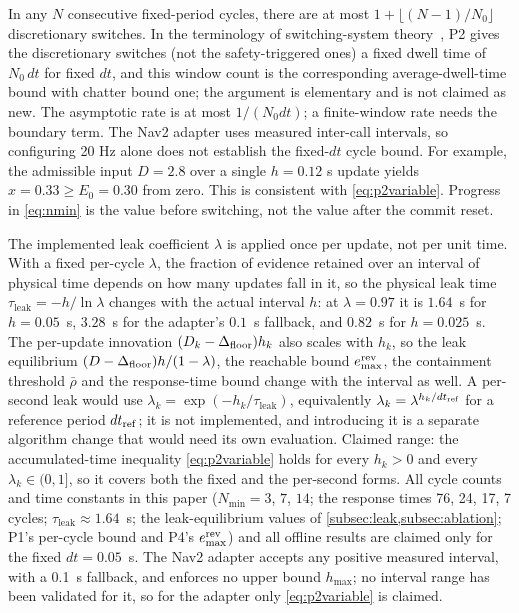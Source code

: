\begin{remark}
In any $N$ consecutive fixed-period cycles, there are at most $1+\lfloor(N-1)/N_0\rfloor$ discretionary switches. In the terminology of switching-system theory~\citep{hespanha1999dwell}, P2 gives the discretionary switches (not the safety-triggered ones) a fixed dwell time of $N_0\,dt$ for fixed $dt$, and this window count is the corresponding average-dwell-time bound with chatter bound one; the argument is elementary and is not claimed as new. The asymptotic rate is at most $1/(N_0dt)$; a finite-window rate needs the boundary term. The Nav2 adapter uses measured inter-call intervals, so configuring 20 Hz alone does not establish the fixed-$dt$ cycle bound. For example, the admissible input $D=2.8$ over a single $h=0.12$ s update yields $x=0.33\ge E_0=0.30$ from zero. This is consistent with \eqref{eq:p2variable}. Progress in \eqref{eq:nmin} is the value before switching, not the value after the commit reset.
\end{remark}

\begin{remark} \label{rem:vardt}
The implemented leak coefficient $\lambda$ is applied once per update, not per unit time. With a fixed per-cycle $\lambda$, the fraction of evidence retained over an interval of physical time depends on how many updates fall in it, so the physical leak time $\tau_{\text{leak}}=-h/\ln\lambda$ changes with the actual interval $h$: at $\lambda=0.97$ it is $1.64$~s for $h=0.05$~s, $3.28$~s for the adapter's $0.1$~s fallback, and $0.82$~s for $h=0.025$~s. The per-update innovation $(D_k-\Delta_{\text{floor}})h_k$ also scales with $h_k$, so the leak equilibrium $(D-\Delta_{\text{floor}})h/(1-\lambda)$, the reachable bound $e^{\text{rev}}_{\max}$, the containment threshold $\bar\rho$ and the response-time bound change with the interval as well. A per-second leak would use $\lambda_k=\exp(-h_k/\tau_{\text{leak}})$, equivalently $\lambda_k=\lambda^{h_k/dt_{\rm ref}}$ for a reference period $dt_{\rm ref}$; it is not implemented, and introducing it is a separate algorithm change that would need its own evaluation. Claimed range: the accumulated-time inequality \eqref{eq:p2variable} holds for every $h_k>0$ and every $\lambda_k\in(0,1]$, so it covers both the fixed and the per-second forms. All cycle counts and time constants in this paper ($N_{\min}=3$, $7$, $14$; the response times 76, 24, 17, 7 cycles; $\tau_{\text{leak}}\approx1.64$~s; the leak-equilibrium values of \cref{subsec:leak,subsec:ablation}; P1's per-cycle bound and P4's $e^{\text{rev}}_{\max}$) and all offline results are claimed only for the fixed $dt=0.05$~s. The Nav2 adapter accepts any positive measured interval, with a 0.1~s fallback, and enforces no upper bound $h_{\max}$; no interval range has been validated for it, so for the adapter only \eqref{eq:p2variable} is claimed.
\end{remark}

